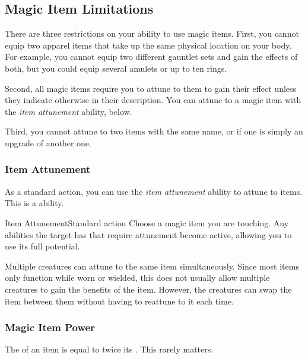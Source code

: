 
  \subsection{Magic Item Limitations}

    There are three restrictions on your ability to use magic items.
    First, you cannot equip two apparel items that take up the same physical location on your body.
    For example, you cannot equip two different gauntlet sets and gain the effects of both, but you could equip several amulets or up to ten rings.

    Second, all magic items require you to attune to them to gain their effect unless they indicate otherwise in their description.
    You can attune to a magic item with the \textit{item attunement} ability, below.

    Third, you cannot attune to two items with the same name, or if one is simply an upgrade of another one.

    \subsubsection{Item Attunement}\label{Item Attunement}

      As a standard action, you can use the \textit{item attunement} ability to attune to items.
      This is a \magical ability.

      \begin{attuneability}{Item Attunement}{Standard action}
        \abilitytags \atAttune
        \rankline
        Choose a magic item you are touching.
        Any abilities the target has that require attunement become active, allowing you to use its full potential.
      \end{attuneability}

       Multiple creatures can attune to the same item simultaneously.
      Since most items only function while worn or wielded, this does not usually allow multiple creatures to gain the benefits of the item.
      However, the creatures can swap the item between them without having to reattune to it each time.

    \subsubsection{Magic Item Power}\label{Magic Item Power}
      The  of an item is equal to twice its .
      This rarely matters.


